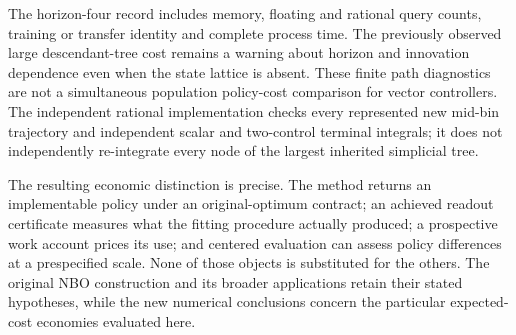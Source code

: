 The horizon-four record includes memory, floating and rational query counts, training or transfer identity and complete process time. The previously observed large descendant-tree cost remains a warning about horizon and innovation dependence even when the state lattice is absent. These finite path diagnostics are not a simultaneous population policy-cost comparison for vector controllers. The independent rational implementation checks every represented new mid-bin trajectory and independent scalar and two-control terminal integrals; it does not independently re-integrate every node of the largest inherited simplicial tree.

The resulting economic distinction is precise. The method returns an implementable policy under an original-optimum contract; an achieved readout certificate measures what the fitting procedure actually produced; a prospective work account prices its use; and centered evaluation can assess policy differences at a prespecified scale. None of those objects is substituted for the others. The original NBO construction and its broader applications retain their stated hypotheses, while the new numerical conclusions concern the particular expected-cost economies evaluated here.
